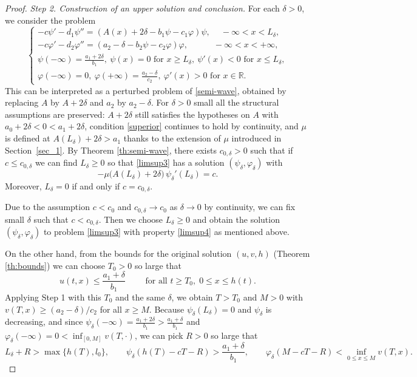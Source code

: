 \documentclass[reqno]{amsart}
\newcommand{\rev}[1]{#1}
\theoremstyle{plain}
\theoremstyle{definition}
\theoremstyle{remark}
\begin{document}
\begin{proof}
		\textit{Step 2. Construction of an upper solution and conclusion.}
		For each $\delta>0$, we consider the problem
		\begin{equation}\label{limsup3}
			\begin{cases}
				-c \psi' - d_1 \psi'' = (A(x)+2\delta - b_1\psi - c_1\varphi)\psi, ~\quad-\infty < x < L_\delta,\\
				-c \varphi' - d_2 \varphi'' = (a_2 - \delta - b_2\psi - c_2\varphi)\varphi, \quad\qquad -\infty < x < +\infty,\\
				\psi(-\infty) = \frac{a_1 + 2\delta}{b_1}, ~ \psi(x)=0 \text{ for } x\ge L_\delta, ~ \psi'(x)<0 \text{ for } x\le L_\delta,\\	
				\varphi(-\infty) = 0, ~ \varphi(+\infty)=\frac{a_2 - \delta}{c_2}, ~ \varphi'(x)>0 \text{ for } x\in \mathbb{R}.
			\end{cases}
		\end{equation}
		This can be interpreted as a perturbed problem of \eqref{semi-wave}\rev{,
		obtained by replacing $A$ by $A+2\delta$ and $a_2$ by $a_2-\delta$. For
		$\delta>0$ small all the structural assumptions are preserved: $A+2\delta$
		still satisfies the hypotheses on $A$ with $a_0+2\delta<0<a_1+2\delta$,
		condition \eqref{superior} continues to hold by continuity, and $\mu$ is
		defined at $A(L_\delta)+2\delta>a_1$ thanks to the extension of $\mu$
		introduced in Section~\ref{sec_1}}. By Theorem \ref{th:semi-wave}, there exists $c_{0,\delta}>0$ such that if $c \le c_{0,\delta}$ we can find $L_\delta \ge 0$ so that \eqref{limsup3} has a solution \((\psi_\delta,\varphi_\delta)\) with
		\begin{equation}\label{limsup4}
			-\mu\bigl(A(L_\delta)+2\delta\bigr)\,\psi_\delta'(L_\delta)=c.
		\end{equation}
		Moreover, $L_\delta=0$ if and only if $c=c_{0,\delta}$.
		
		Due to the assumption $c < c_0$ and $c_{0,\delta} \to c_0$ as $\delta \to 0$ by continuity, we can fix small $\delta$ such that $c < c_{0,\delta}$. Then we choose $L_\delta \ge 0$ and obtain the solution \((\psi_\delta,\varphi_\delta)\) to problem \eqref{limsup3} with property \eqref{limsup4} as mentioned above.
		
		On the other hand, from the bounds for the original solution \((u,v,h)\) (Theorem \ref{th:bounds}) we can choose \(T_0>0\) so large that
		\[
		u(t,x)\le\frac{a_1+\delta}{b_1}\qquad\text{ for all } t\ge T_0,\;0\le x\le h(t).
		\]
		Applying Step 1 with this $T_0$ and the same $\delta$, we obtain \(T>T_0\) and \(M>0\) with \(v(T,x)\ge (a_2-\delta)/c_2\) for all \(x\ge M\).
		Because \(\psi_\delta(L_\delta)=0\) and \(\psi_\delta\) is decreasing, \rev{and
		since $\psi_\delta(-\infty)=\frac{a_1+2\delta}{b_1}>\frac{a_1+\delta}{b_1}$
		and $\varphi_\delta(-\infty)=0<\inf_{[0,M]}v(T,\cdot)$,} we can pick \(R>0\) so large that
		\[
		L_\delta+R>\max\{h(T),l_0\},\qquad
		\psi_\delta(h(T)\rev{{}-cT}-R)>\frac{a_1+\delta}{b_1},\qquad
		\varphi_\delta(M\rev{{}-cT}-R)<\inf_{0\le x\le M}v(T,x).
		\]
		

\end{proof}
\end{document}
